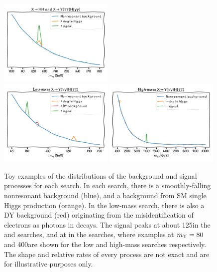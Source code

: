 \begin{figure}
  \centering
  \includegraphics[width=0.49\textwidth]{Figures/Dihiggs/introduction/xhh.pdf}\\
  \includegraphics[width=0.49\textwidth]{Figures/Dihiggs/introduction/xyh_low_mass.pdf}
  \includegraphics[width=0.49\textwidth]{Figures/Dihiggs/introduction/xyh_high_mass.pdf}
  \caption[Signal and Background \mgg Distributions in the Di-Higgs Search]{Toy examples of the \mgg distributions of the background and signal processes for each search. In each search, there is a smoothly-falling nonresonant background (blue), and a background from SM single Higgs production (orange). In the low-mass search, there is also a DY background (red) originating from the misidentification of electrons as photons in \Zee decays. The signal peaks at about 125\GeV in the \XHH and \XYttHgg searches, and at \mY in the \XYggHtt searches, where examples at $m_{\mathrm{Y}}=80$ and 400\GeV are shown for the low and high-mass searches respectively. The shape and relative rates of every process are not exact and are for illustrative purposes only.}\label{fig:toy_examples}
\end{figure}

